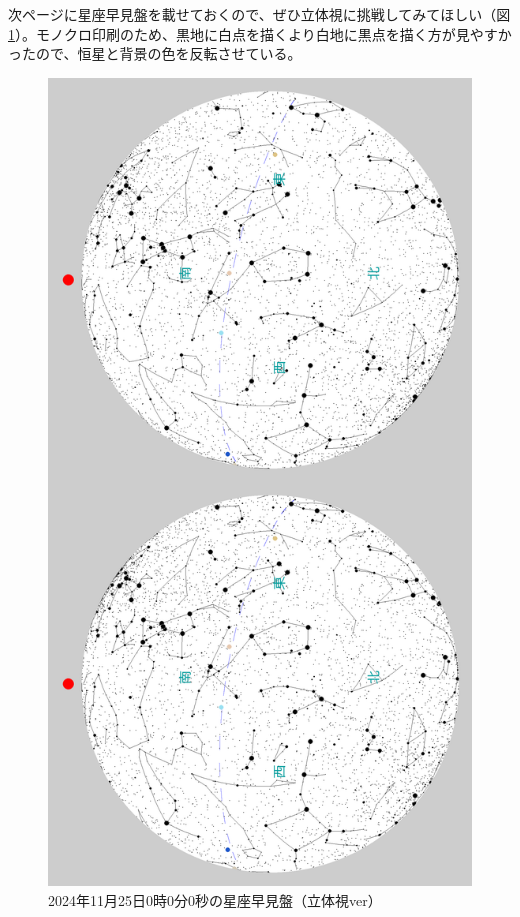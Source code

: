 \documentclass[../main]{subfiles}
\begin{document}
次ページに星座早見盤を載せておくので、ぜひ立体視に挑戦してみてほしい（図\ref{fig:stereogram}）。モノクロ印刷のため、黒地に白点を描くより白地に黒点を描く方が見やすかったので、恒星と背景の色を反転させている。

\newpage
\begin{figure}[H]
  \centering
  \label{fig:stereogram}
  \includegraphics[width=13cm]{sections/Fujisawa/image/CrossEyed_2024_11_25_0_0_0.png}
  \caption{2024年11月25日0時0分0秒の星座早見盤（立体視ver）}
\end{figure}
\newpage
\end{document}
